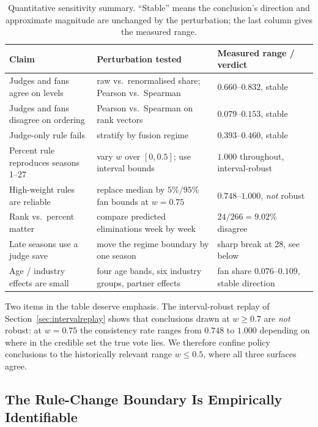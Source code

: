 \begin{table}[H]
\centering
\caption{Quantitative sensitivity summary. ``Stable'' means the conclusion's direction and
approximate magnitude are unchanged by the perturbation; the last column gives the measured
range.}
\label{tab:sensitivitysummary}
\begin{tabular}{>{\raggedright\arraybackslash}p{4.1cm}>{\raggedright\arraybackslash}p{4.6cm}>{\raggedright\arraybackslash}p{5.0cm}}
\toprule
Claim & Perturbation tested & Measured range / verdict \\
\midrule
Judges and fans agree on levels & raw vs.\ renormalised share; Pearson vs.\ Spearman
  & $0.660$--$0.832$, stable \\
Judges and fans disagree on ordering & Pearson vs.\ Spearman on rank vectors
  & $0.079$--$0.153$, stable \\
Judge-only rule fails & stratify by fusion regime
  & $0.393$--$0.460$, stable \\
Percent rule reproduces seasons 1--27 & vary $w$ over $[0,0.5]$; use interval bounds
  & $1.000$ throughout, interval-robust \\
High-weight rules are reliable & replace median by $5\%$/$95\%$ fan bounds at $w=0.75$
  & $0.748$--$1.000$, \emph{not} robust \\
Rank vs.\ percent matter & compare predicted eliminations week by week
  & $24/266=9.02\%$ disagree \\
Late seasons use a judge save & move the regime boundary by one season
  & sharp break at 28, see below \\
Age / industry effects are small & four age bands, six industry groups, partner effects
  & fan share $0.076$--$0.109$, stable direction \\
\bottomrule
\end{tabular}
\end{table}

Two items in the table deserve emphasis. The interval-robust replay of
Section~\ref{sec:intervalreplay} shows that conclusions drawn at $w\ge0.7$ are \emph{not}
robust: at $w=0.75$ the consistency rate ranges from $0.748$ to $1.000$ depending on where in
the credible set the true vote lies. We therefore confine policy conclusions to the
historically relevant range $w\le0.5$, where all three surfaces agree.

\subsection{The Rule-Change Boundary Is Empirically Identifiable}\label{sec:eraboundary}

